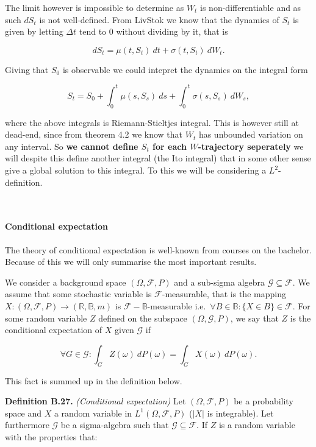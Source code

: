 \documentclass[
]{article}
\begin{document}
The limit however is impossible to determine as \(W_t\) is
non-differentiable and as such \(dS_t\) is not well-defined. From
LivStok we know that the dynamics of \(S_t\) is given by letting
\(\Delta t\) tend to 0 without dividing by it, that is

\[
dS_t=\mu(t,S_t)\ dt+\sigma(t,S_t)\ dW_t.
\]

Giving that \(S_0\) is observable we could intepret the dynamics on the
integral form

\[
S_t=S_0+\int_0^t\mu(s,S_s)\ ds+\int_0^t\sigma(s,S_s)\ dW_s,
\]

where the above integrals is Riemann-Stieltjes integral. This is however
still at dead-end, since from theorem 4.2 we know that \(W_t\) has
unbounded variation on any interval. So \textbf{we cannot define \(S_t\)
for each \(W\)-trajectory seperately} we will despite this define
another integral (the Ito integral) that in some other sense give a
global solution to this integral. To this we will be considering a
\(L^2\)-definition.

~

\hypertarget{conditional-expectation}{%
\paragraph{Conditional expectation}\label{conditional-expectation}}

The theory of conditional expectation is well-known from courses on the
bachelor. Because of this we will only summarise the most important
results.

We consider a background space \((\Omega,\mathcal{F},P)\) and a
sub-sigma algebra \(\mathcal{G}\subseteq \mathcal{F}\). We assume that
some stochastic variable is \(\mathcal{F}\)-measurable, that is the
mapping \(X : (\Omega,\mathcal{F},P) \to (\mathbb{R},\mathbb{B},m)\) is
\(\mathcal{F}-\mathbb{B}\)-measurable
i.e.~\(\forall B\in\mathbb{B} : \{X\in B\}\in\mathcal{F}\). For some
random variable \(Z\) defined on the subspace
\((\Omega,\mathcal{G},P)\), we say that \(Z\) is the conditional
expectation of \(X\) given \(\mathcal{G}\) if

\[
\forall G\in\mathcal{G} : \int_G Z(\omega)\ dP(\omega)=\int_G X(\omega)\ dP(\omega).
\]

This fact is summed up in the definition below.

\textbf{Definition B.27.} \emph{(Conditional expectation)} Let
\((\Omega,\mathcal{F},P)\) be a probability space and \(X\) a random
variable in \(L^1(\Omega,\mathcal{F},P)\) (\(\vert X\vert\) is
integrable). Let furthermore \(\mathcal{G}\) be a sigma-algebra such
that \(\mathcal{G}\subseteq \mathcal{F}\). If \(Z\) is a random variable
with the properties that:
\end{document}
